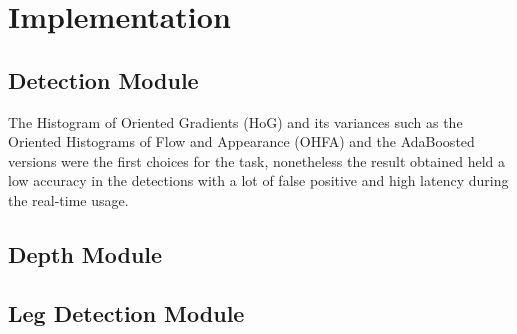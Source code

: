 \chapter{Implementation}
\label{chapter3}

\section{Detection Module}

The Histogram of Oriented Gradients (HoG) and its variances such as the Oriented Histograms of Flow and Appearance (OHFA) and the AdaBoosted versions were the first choices for the task, nonetheless the result obtained held a low accuracy in the detections with a lot of false positive and high latency during the real-time usage.

\section{Depth Module}
\section{Leg Detection Module}